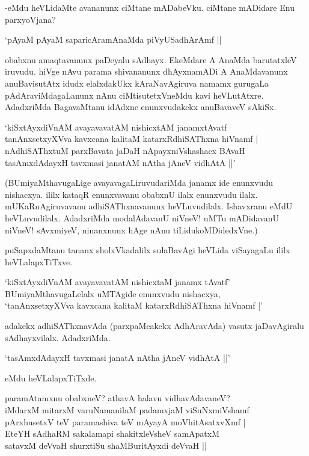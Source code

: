 -eMdu heVLidaMte avananunx ciMtane mADabeVku. ciMtane mADidare Enu parxyoVjana?

\begin{shloka}
`pAyaM pAyaM saparicAramAnaMda piVyUSadhArAmf ||
\end{shloka}

obabxnu amaqtavanunx paDeyalu sAdhayx. EkeMdare A AnaMda barutatxleV iruvudu. hiVge nAvu parama shivananunx dhAyxnamADi A AnaMdavanunx anuBavisutAtx idudx elalxdakUkx kAraNavAgiruva namamx gurugaLa pAdAraviMdagaLanunx nAnu ciMtisutetxVneMdu kavi heVLutAtxre. AdadxriMda BagavaMtanu idAdxne enunxvudakekx anuBavaveV sAkiSx.

\begin{shloka}
`kiSxtAyxdiVnAM avayavavatAM nishicxtAM janamxtAvatf\\
tanAnxsetxyXVva kavxcana kalitaM katarxRdhiSAThxna hiVnamf |\\
nAdhiSAThxtuM parxBavata jaDaH nApayxniVshashacx BAvaH\\
tasAmxdAdayxH tavxmasi janatAM nAtha jAneV vidhAtA ||'
\end{shloka}

(BUmiyaMthavugaLige avayavagaLiruvudariMda janamx ide enunxvudu nishacxya. ililx kataqR enunxvavanu obabxnU ilalx enunxvudu ilalx. mUKaRnAgiruvavanu adhiSAThxnavanunx heVLuvudilalx. Ishavxranu eMdU heVLuvudilalx. AdadxriMda modalAdavanU niVneV! uMTu mADidavanU niVneV! sAvxmiyeV, ninanxnunx hAge nAnu tiLidukoMDidedxVne.)

puSapxdaMtanu tananx sholxVkadalilx sulaBavAgi heVLida viSayagaLu ililx heVLalapxTiTxve.

\begin{shloka}
`kiSxtAyxdiVnAM avayavavatAM nishicxtaM janamx tAvatf'\\
BUmiyaMthavugaLelalx uMTAgide enunxvudu nishacxya,\\
`tanAnxsetxyXVva kavxcana kalitaM katarxRdhiSAThxna hiVnamf |'
\end{shloka}

adakekx adhiSAThxnavAda (parxpaMcakekx AdhAravAda) vasutx jaDavAgiralu sAdhayxvilalx. AdadxriMda.

\begin{shloka}
`tasAmxdAdayxH tavxmasi janatA nAtha jAneV vidhAtA ||'
\end{shloka}

eMdu heVLalapxTiTxde.

\begin{shloka}
paramAtamxnu obabxneV? athavA halavu vidhavAdavaneV?\\[5pt]
iMdarxM mitarxM varuNamanilaM padamxjaM viSuNxmiVshamf\\
pArxhusetxV teV paramashiva teV mAyayA moVhitAsatxvXmf |\\[5pt]
EteYH sAdhaRM sakalamapi shakitxleVsheV samApatxM\\
satavxM deVvaH shurxtiSu shaMBuritAyxdi deVvaH ||
\end{shloka}

